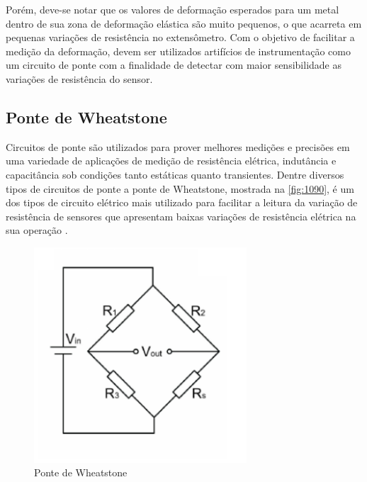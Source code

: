 Porém, deve-se notar que os valores de deformação esperados para um metal dentro de sua zona de deformação elástica são muito pequenos, o que acarreta em pequenas
variações de resistência no extensômetro. Com o objetivo de facilitar a medição da deformação, devem ser utilizados artifícios de instrumentação como um circuito de ponte
com a finalidade de detectar com maior sensibilidade as variações de resistência do sensor.

\subsection{Ponte de Wheatstone}

Circuitos de ponte são utilizados para prover melhores medições e precisões em uma variedade de aplicações de medição de resistência elétrica, indutância e capacitância
sob condições tanto estáticas quanto transientes.
Dentre diversos tipos de circuitos de ponte a ponte de Wheatstone, mostrada na \autoref{fig:1090}, é um dos tipos de circuito elétrico
mais utilizado para facilitar a leitura da variação de resistência de sensores que apresentam baixas variações de resistência elétrica na sua operação \autocite{Hollman2011}.

\begin{figure}[htb]
	\caption{\label{fig:1090} Ponte de Wheatstone}
	\begin{center}
		\includegraphics[width=300]{pictures/1090.png}
	\end{center}
\end{figure}

